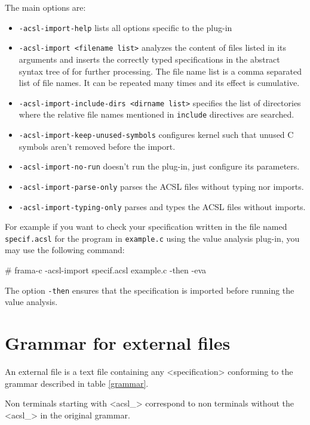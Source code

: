 \documentclass{frama-c-book}
\begin{document}
The main options are:
\begin{itemize}{}
\item \verb|-acsl-import-help| lists all options specific to the plug-in
\item \verb|-acsl-import <filename list>| analyzes the content of
  files listed in its arguments and inserts the correctly typed
  specifications in the abstract syntax tree of \FramaC for further processing.
  The file name list is a comma separated list of file names.
  It can be repeated many times and its effect is cumulative.
\item \verb|-acsl-import-include-dirs <dirname list>| specifies the list of
  directories where the relative file names mentioned in \verb|include|
  directives are searched.
\item \verb|-acsl-import-keep-unused-symbols| configures \FramaC kernel such that
  unused C symbols aren't removed before the import.
\item \verb|-acsl-import-no-run| doesn't run the plug-in, just configure its parameters.
\item \verb|-acsl-import-parse-only| parses the ACSL files without typing nor imports.
\item \verb|-acsl-import-typing-only| parses and types the ACSL files without imports.
\end{itemize}

For example if you want to check your specification written in the file
named \verb|specif.acsl| for the program in \verb|example.c| using the
value analysis plug-in\cite{value}, you may use the following command:
\begin{shell}
# frama-c -acsl-import specif.acsl example.c -then -eva
\end{shell}
The option \verb|-then| ensures that the specification is imported
before running the value analysis.

\section*{Grammar for external \acsl files}
\markright{}

An external \acsl file is a text file containing any <specification> conforming to the grammar described in table \ref{grammar}.

Non terminals starting with <acsl\_> correspond to non terminals without the <acsl\_> in the original \acsl grammar\cite{acsl}.
\end{document}
